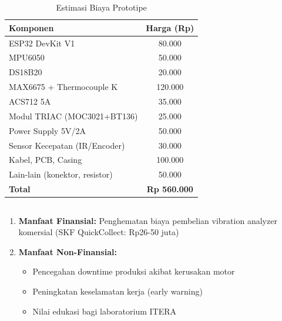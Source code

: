 \documentclass{elsinta}
\begin{document}
\section{\FinancialAnalysisTitle}

\subsection{\CostEstimationTitle}

\begin{table}[H]
\centering
\caption{Estimasi Biaya Prototipe}
\begin{tabular}{|l|c|}
    \hline
    \textbf{Komponen} & \textbf{Harga (Rp)} \\
    \hline
    ESP32 DevKit V1 & 80.000 \\
    MPU6050 & 50.000 \\
    DS18B20 & 20.000 \\
    MAX6675 + Thermocouple K & 120.000 \\
    ACS712 5A & 35.000 \\
    Modul TRIAC (MOC3021+BT136) & 25.000 \\
    Power Supply 5V/2A & 50.000 \\
    Sensor Kecepatan (IR/Encoder) & 30.000 \\
    Kabel, PCB, Casing & 100.000 \\
    Lain-lain (konektor, resistor) & 50.000 \\
    \hline
    \textbf{Total} & \textbf{Rp 560.000} \\
    \hline
\end{tabular}
\end{table}

\subsection{\CostBenefitTitle}

\begin{enumerate}
    \item \textbf{Manfaat Finansial:} Penghematan biaya pembelian vibration analyzer komersial (SKF QuickCollect: Rp26-50 juta)
    \item \textbf{Manfaat Non-Finansial:}
    \begin{itemize}
        \item Pencegahan downtime produksi akibat kerusakan motor
        \item Peningkatan keselamatan kerja (early warning)
        \item Nilai edukasi bagi laboratorium ITERA
    \end{itemize}
\end{enumerate}
\end{document}
